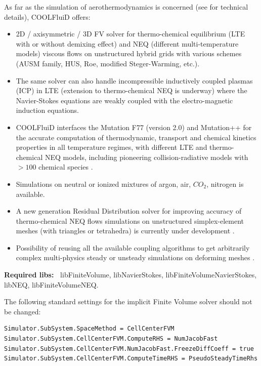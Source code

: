 \documentclass[11pt]{article}
\begin{document}
As far as the simulation of aerothermodynamics is concerned 
(see \cite{phd:lani, phd:panesi} for technical details), COOLFluiD offers: 
\begin{itemize}
\item 
  2D / axisymmetric / 3D FV solver for thermo-chemical equilibrium 
  (LTE with or without demixing effect) and NEQ 
  (different multi-temperature models) viscous flows 
  on unstructured hybrid grids with various schemes 
  (AUSM family, HUS, Roe, modified Steger-Warming, etc.).
\item 
  The same solver can also handle incompressible inductively coupled plasmas (ICP) in LTE 
  (extension to thermo-chemical NEQ is underway) where the Navier-Stokes equations 
  are weakly coupled with the electro-magnetic induction equations. 
\item
  COOLFluiD interfaces the Mutation F77 (version 2.0) and Mutation++ for the 
  accurate computation of thermodynamic, transport and chemical kinetics properties 
  in all temperature regimes, with different LTE and thermo-chemical NEQ models, 
  including pioneering collision-radiative models with $> 100$ chemical species \cite{munafo10}.
\item
  Simulations on neutral or ionized mixtures of argon, air, $CO_2$, nitrogen is available. 
\item 
  A new generation Residual Distribution solver for improving accuracy of 
  thermo-chemical NEQ flows simulations on unstructured simplex-element meshes 
  (with triangles or tetrahedra) is currently under development \cite{phd:lani}. 
\item
  Possibility of reusing all the available coupling algorithms to 
  get arbitrarily complex multi-physics steady or unsteady simulations 
  on deforming meshes \cite{phd:wuilbaut}.
\end{itemize}

{\bf Required libs:~} libFiniteVolume, libNavierStokes, libFiniteVolumeNavierStokes, libNEQ,  libFiniteVolumeNEQ. 

The following standard settings for the implicit Finite Volume solver should not be changed:

\begin{lstlisting}[breaklines]
Simulator.SubSystem.SpaceMethod = CellCenterFVM
Simulator.SubSystem.CellCenterFVM.ComputeRHS = NumJacobFast
Simulator.SubSystem.CellCenterFVM.NumJacobFast.FreezeDiffCoeff = true
Simulator.SubSystem.CellCenterFVM.ComputeTimeRHS = PseudoSteadyTimeRhs
\end{lstlisting}
\end{document}
